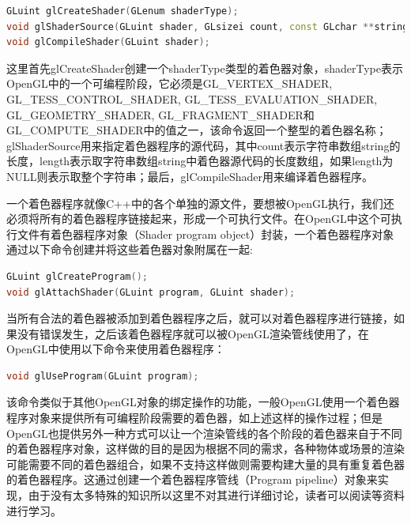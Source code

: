 \begin{lstlisting}[language=C++]
GLuint glCreateShader​(GLenum shaderType​);
void glShaderSource​(GLuint shader​, GLsizei count​, const GLchar **string​, const GLint *length​);
void glCompileShader​(GLuint shader​);	
\end{lstlisting}

这里首先glCreateShader创建一个shaderType类型的着色器对象，shaderType表示OpenGL中的一个可编程阶段，它必须是GL\_VERTEX\_SHADER, GL\_TESS\_CONTROL\_SHADER, GL\_TESS\_EVALUATION\_SHADER, GL\_GEOMETRY\_SHADER, GL\_FRAGMENT\_SHADER和GL\_COMPUTE\_SHADER中的值之一，该命令返回一个整型的着色器名称；glShaderSource用来指定着色器程序的源代码，其中count表示字符串数组string的长度，length表示取字符串数组string中着色器源代码的长度数组，如果length为NULL则表示取整个字符串；最后，glCompileShader用来编译着色器程序。

一个着色器程序就像C++中的各个单独的源文件，要想被OpenGL执行，我们还必须将所有的着色器程序链接起来，形成一个可执行文件。在OpenGL中这个可执行文件有着色器程序对象（Shader program object）封装，一个着色器程序对象通过以下命令创建并将这些着色器对象附属在一起:

\begin{lstlisting}[language=C++]
GLuint glCreateProgram​();
void glAttachShader​(GLuint program​, GLuint shader​);
\end{lstlisting}

当所有合法的着色器被添加到着色器程序之后，就可以对着色器程序进行链接，如果没有错误发生，之后该着色器程序就可以被OpenGL渲染管线使用了，在OpenGL中使用以下命令来使用着色器程序：

\begin{lstlisting}[language=C++]
void glUseProgram(GLuint program​);
\end{lstlisting}

该命令类似于其他OpenGL对象的绑定操作的功能，一般OpenGL使用一个着色器程序对象来提供所有可编程阶段需要的着色器，如上述这样的操作过程；但是OpenGL也提供另外一种方式可以让一个渲染管线的各个阶段的着色器来自于不同的着色器程序对象，这样做的目的是因为根据不同的需求，各种物体或场景的渲染可能需要不同的着色器组合，如果不支持这样做则需要构建大量的具有重复着色器的着色器程序。这通过创建一个着色器程序管线（Program pipeline）对象来实现，由于没有太多特殊的知识所以这里不对其进行详细讨论，读者可以阅读\cite{b:OpenGL4.5CoreProfile}等资料进行学习。





